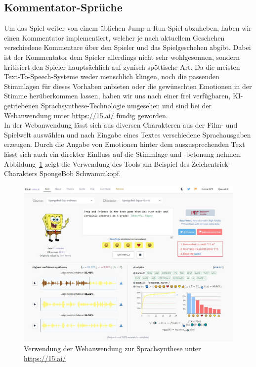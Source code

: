 \subsection{Kommentator-Sprüche}
Um das Spiel weiter von einem üblichen Jump-n-Run-Spiel abzuheben, haben wir einen Kommentator implementiert, welcher je nach aktuellem Geschehen verschiedene Kommentare über den Spieler und
das Spielgeschehen abgibt. Dabei ist der Kommentator dem Spieler allerdings nicht sehr wohlgesonnen, sondern kritisiert den Spieler hauptsächlich auf zynisch-spöttische Art. Da die meisten Text-To-Speech-Systeme weder menschlich klingen, noch die passenden Stimmlagen für dieses Vorhaben anbieten oder die gewünschten Emotionen in der Stimme herüberkommen lassen, haben wir uns nach einer frei verfügbaren, KI-getriebenen Sprachsynthese-Technologie umgesehen und sind bei der Webanwendung unter \url{https://15.ai/} fündig geworden.\\

In der Webanwendung lässt sich aus diversen Charakteren aus der Film- und Spielwelt auswählen und nach Eingabe eines Textes verschiedene Sprachausgaben erzeugen. Durch die Angabe von Emotionen hinter dem auszusprechenden Text lässt sich auch ein direkter Einfluss auf die Stimmlage und -betonung nehmen. Abbildung~\ref{fig:15Ai} zeigt die Verwendung des Tools am Beispiel des Zeichentrick-Charakters SpongeBob Schwammkopf.\\

\begin{figure}[th]
\centering
\includegraphics[width=150mm]{Figures/15AI.jpg}
\decoRule
\caption[Verwendung der Webanwendung 15.ai zur Sprachsynthese]{Verwendung der Webanwendung zur Sprachsynthese unter \url{https://15.ai/}}
\label{fig:15Ai}
\end{figure}


